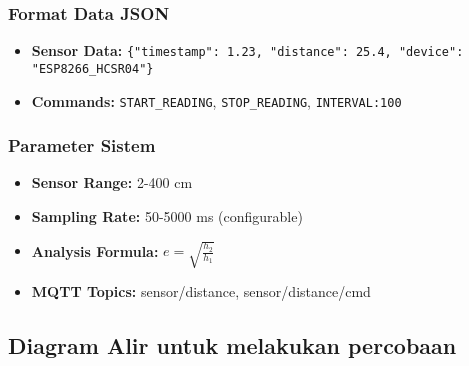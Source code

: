 \documentclass[a4paper,10pt]{article}
\begin{document}
\subsubsection{Format Data JSON}
\begin{itemize}
    \item \textbf{Sensor Data:} \texttt{\{"timestamp": 1.23, "distance": 25.4, "device": "ESP8266\_HCSR04"\}}
    \item \textbf{Commands:} \texttt{START\_READING}, \texttt{STOP\_READING}, \texttt{INTERVAL:100}
\end{itemize}

\subsubsection{Parameter Sistem}
\begin{itemize}
    \item \textbf{Sensor Range:} 2-400 cm
    \item \textbf{Sampling Rate:} 50-5000 ms (configurable)
    \item \textbf{Analysis Formula:} $e = \sqrt{\frac{h_2}{h_1}}$
    \item \textbf{MQTT Topics:} sensor/distance, sensor/distance/cmd
\end{itemize}

\subsection{Diagram Alir untuk melakukan percobaan}
\end{document}
